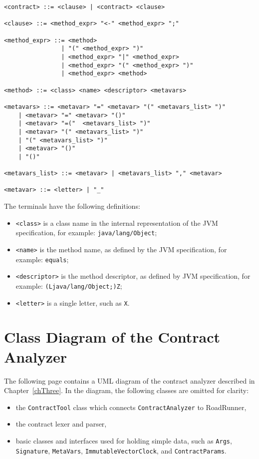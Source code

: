 \begin{lstlisting}
<contract> ::= <clause> | <contract> <clause>

<clause> ::= <method_expr> "<-" <method_expr> ";"

<method_expr> ::= <method>
                | "(" <method_expr> ")"
                | <method_expr> "|" <method_expr>
                | <method_expr> "(" <method_expr> ")"
                | <method_expr> <method>

<method> ::= <class> <name> <descriptor> <metavars>

<metavars> ::= <metavar> "=" <metavar> "(" <metavars_list> ")"
    | <metavar> "=" <metavar> "()" 
    | <metavar> "=("  <metavars_list> ")"
    | <metavar> "(" <metavars_list> ")"
    | "(" <metavars_list> ")"
    | <metavar> "()" 
    | "()"

<metavars_list> ::= <metavar> | <metavars_list> "," <metavar>

<metavar> ::= <letter> | "_"
\end{lstlisting}

The terminals have the following definitions:
\begin{itemize}
    \item \texttt{<class>} is a class name in the internal representation of
        the JVM specification, for example: \texttt{java/lang/Object};
    \item \texttt{<name>} is the method name, as defined by the JVM
        specification, for example: \texttt{equals};
    \item \texttt{<descriptor>} is the method descriptor, as defined by JVM
        specification, for example: \texttt{(Ljava/lang/Object;)Z};
    \item \texttt{<letter>} is a single letter, such as \texttt{X}.
\end{itemize}

\chapter{Class Diagram of the Contract Analyzer}
\label{diagram}

The following page contains a UML diagram of the contract analyzer described in
Chapter~\ref{chThree}. In the diagram, the following classes are omitted for
clarity:
\begin{itemize}
    \item the \texttt{ContractTool} class which connects
    \texttt{ContractAnalyzer} to RoadRunner,
    \item the contract lexer and parser,
    \item basic classes and interfaces used for holding simple data, such as
    \texttt{Args}, \texttt{Signature}, \texttt{MetaVars},
    \texttt{ImmutableVectorClock}, and \texttt{ContractParams}.
\end{itemize}

